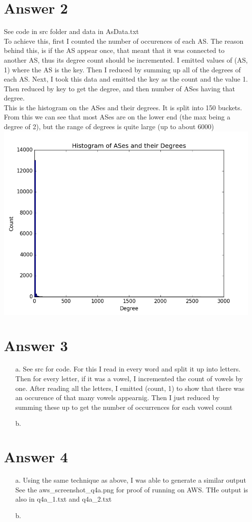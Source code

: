 \documentclass[11pt]{article}
\theoremstyle{definition}
\begin{document}
\section*{Answer 2}
See code in src folder and data in AsData.txt\\
To achieve this, first I counted the number of occurences of each AS.  The reason behind this, is if the AS appear once, that meant that it was connected to another AS, thus its degree count should be incremented.  I emitted values of (AS, 1) where the AS is the key.  Then I reduced by summing up all of the degrees of each AS.  Next, I took this data and emitted the key as the count and the value 1.  Then reduced by key to get the degree, and then number of ASes having that degree.\\
This is the histogram on the ASes and their degrees.  It is split into 150 buckets.  From this we can see that most ASes are on the lower end (the max being a degree of 2), but the range of degrees is quite large (up to about 6000)\\
\includegraphics[scale=0.5]{hist}

\section*{Answer 3}
\begin{enumerate}
  \item[a.] See src for code.  For this I read in every word and split it up into letters.  Then for every letter, if it was a vowel, I incremented the count of vowels by one.  After reading all the letters, I emitted (count, 1) to show that there was an occurence of that many vowels appearnig.  Then I just reduced by summing these up to get the number of occurrences for each vowel count\\

  \item[b.]
\end{enumerate}

\section*{Answer 4}
\begin{enumerate}
  \item[a.] Using the same technique as above, I was able to generate a similar output\\
  See the aws_screenshot_q4a.png for proof of running on AWS.  THe output is also in q4a_1.txt and q4a_2.txt

  \item[b.]
\end{enumerate}
\end{document}
